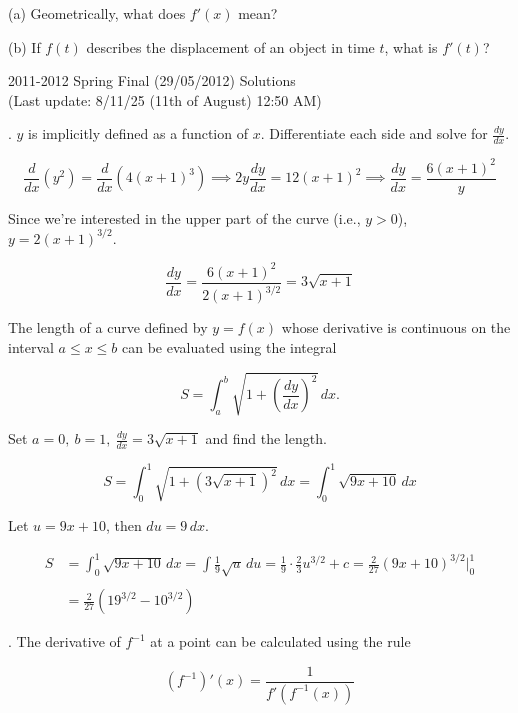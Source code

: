 \documentclass{article}
\begin{document}
\noindent (a) Geometrically, what does $f'(x)$ mean?

\hfill

\noindent (b) If $f(t)$ describes the displacement of an object in time $t$, what is $f'(t)$?

\newpage

\begin{center}
2011-2012 Spring Final (29/05/2012) Solutions\\
(Last update: 8/11/25 (11th of August) 12:50 AM)
\end{center}

. $y$ is implicitly defined as a function of $x$. Differentiate each side and solve for $\displaystyle \frac{dy}{dx}$.

\[\frac d{dx}\left(y^2\right)=\frac d{dx}\left(4(x+1)^3\right)\implies 2y\frac{dy}{dx}=12(x+1)^2\implies\frac{dy}{dx}=\frac{6(x+1)^2}y\]

\hfill

\noindent Since we're interested in the upper part of the curve (i.e., $y>0$), $y=2(x+1)^{3/2}$.

\[\frac{dy}{dx}=\frac{6(x+1)^2}{2(x+1)^{3/2}}=3\sqrt{x+1}\]

\hfill

\noindent The length of a curve defined by $y=f(x)$ whose derivative is continuous on the interval $a\leq x\leq b$ can be evaluated using the integral

\[S=\int_a^b\sqrt{1+\left(\frac{dy}{dx}\right)^2}\,dx.\]

\hfill

\noindent Set $\displaystyle a=0,\:b=1,\:\frac{dy}{dx}=3\sqrt{x+1}$ and find the length.

\[S=\int_0^1\sqrt{1+\left(3\sqrt{x+1}\right)^2}\,dx=\int_0^1\sqrt{9x+10}\,dx\]

\hfill

\noindent Let $u=9x+10$, then $du=9\,dx$.

\begin{align*}
S&=\int_0^1\sqrt{9x+10}\,dx=\int\frac19\sqrt{u}\,du=\frac19\cdot\frac23u^{3/2}+c=\frac2{27}\left(9x+10\right)^{3/2}\bigg|_0^1\\\\&=\boxed{\frac2{27}\left(19^{3/2}-10^{3/2}\right)}
\end{align*}

\hfill

. The derivative of $f^{-1}$ at a point can be calculated using the rule

\[\left(f^{-1}\right)'(x)=\frac1{f'\left(f^{-1}(x)\right)}\]
\end{document}
